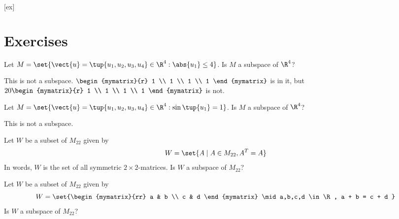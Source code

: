 [ex]
\section*{Exercises}

\begin{enumialphparenastyle}

\begin{ex} Let $M=\set{\vect{u}=\tup{u_{1},u_{2},u_{3},u_{4}} \in 
\R^{4}:\abs{u_{1}} \leq 4}$. Is $M$ a subspace of $\R^4$?
\begin{sol}
This is not a subspace. $\begin{mymatrix}{r}
1 \\
1 \\
1 \\
1
\end{mymatrix} $ is in
it, but $20\begin{mymatrix}{r}
1 \\
1 \\
1 \\
1
\end{mymatrix} $ is not. 
\end{sol}
\end{ex}

\begin{ex} Let $M=\set{\vect{u}=\tup{u_{1},u_{2},u_{3},u_{4}} \in 
\R^{4}:\sin \tup{u_{1}} =1}$. Is $M$ a subspace of $\R^4$?
\begin{sol}
This is not a subspace.
\end{sol}
\end{ex}

\begin{ex} Let $W$ be a subset of $M_{22}$ given by 
\[
W = \set{A \mid A \in M_{22}, A^T = A }  
\]
In words, $W$ is the set of all symmetric $2 \times 2$-matrices. Is $W$ a subspace of $M_{22}$?
\end{ex}

\begin{ex} Let $W$ be a subset of $M_{22}$ given by 
\[
W = \set{\begin{mymatrix}{rr}
a  & b \\
c & d 
\end{mymatrix} \mid a,b,c,d \in \R, a + b = c + d }
\]
Is $W$ a subspace of $M_{22}$?
\end{ex}


\end{enumialphparenastyle}
